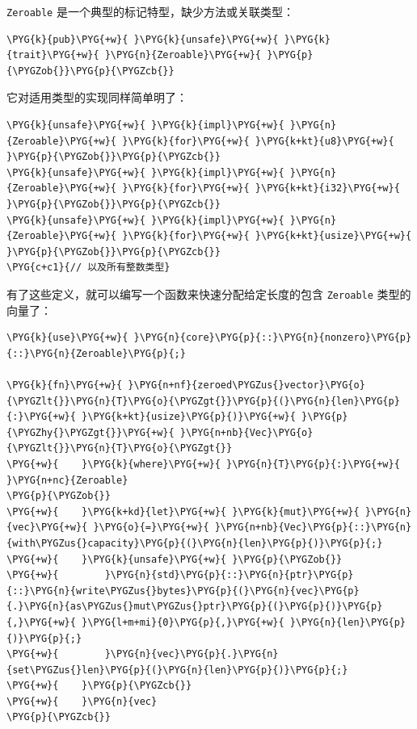 \texttt{Zeroable} 是一个典型的标记特型，缺少方法或关联类型：

\begin{Verbatim}[commandchars=\\\{\},breaklines=true,breakanywhere=true,fontsize=\codefont,xleftmargin=17bp]
\PYG{k}{pub}\PYG{+w}{ }\PYG{k}{unsafe}\PYG{+w}{ }\PYG{k}{trait}\PYG{+w}{ }\PYG{n}{Zeroable}\PYG{+w}{ }\PYG{p}{\PYGZob{}}\PYG{p}{\PYGZcb{}}
\end{Verbatim}

它对适用类型的实现同样简单明了：

\begin{Verbatim}[commandchars=\\\{\},breaklines=true,breakanywhere=true,fontsize=\codefont,xleftmargin=17bp]
\PYG{k}{unsafe}\PYG{+w}{ }\PYG{k}{impl}\PYG{+w}{ }\PYG{n}{Zeroable}\PYG{+w}{ }\PYG{k}{for}\PYG{+w}{ }\PYG{k+kt}{u8}\PYG{+w}{ }\PYG{p}{\PYGZob{}}\PYG{p}{\PYGZcb{}}
\PYG{k}{unsafe}\PYG{+w}{ }\PYG{k}{impl}\PYG{+w}{ }\PYG{n}{Zeroable}\PYG{+w}{ }\PYG{k}{for}\PYG{+w}{ }\PYG{k+kt}{i32}\PYG{+w}{ }\PYG{p}{\PYGZob{}}\PYG{p}{\PYGZcb{}}
\PYG{k}{unsafe}\PYG{+w}{ }\PYG{k}{impl}\PYG{+w}{ }\PYG{n}{Zeroable}\PYG{+w}{ }\PYG{k}{for}\PYG{+w}{ }\PYG{k+kt}{usize}\PYG{+w}{ }\PYG{p}{\PYGZob{}}\PYG{p}{\PYGZcb{}}
\PYG{c+c1}{// 以及所有整数类型}
\end{Verbatim}

有了这些定义，就可以编写一个函数来快速分配给定长度的包含 \texttt{Zeroable} 类型的向量了：

\begin{Verbatim}[commandchars=\\\{\},breaklines=true,breakanywhere=true,fontsize=\codefont,xleftmargin=17bp]
\PYG{k}{use}\PYG{+w}{ }\PYG{n}{core}\PYG{p}{::}\PYG{n}{nonzero}\PYG{p}{::}\PYG{n}{Zeroable}\PYG{p}{;}

\PYG{k}{fn}\PYG{+w}{ }\PYG{n+nf}{zeroed\PYGZus{}vector}\PYG{o}{\PYGZlt{}}\PYG{n}{T}\PYG{o}{\PYGZgt{}}\PYG{p}{(}\PYG{n}{len}\PYG{p}{:}\PYG{+w}{ }\PYG{k+kt}{usize}\PYG{p}{)}\PYG{+w}{ }\PYG{p}{\PYGZhy{}\PYGZgt{}}\PYG{+w}{ }\PYG{n+nb}{Vec}\PYG{o}{\PYGZlt{}}\PYG{n}{T}\PYG{o}{\PYGZgt{}}
\PYG{+w}{    }\PYG{k}{where}\PYG{+w}{ }\PYG{n}{T}\PYG{p}{:}\PYG{+w}{ }\PYG{n+nc}{Zeroable}
\PYG{p}{\PYGZob{}}
\PYG{+w}{    }\PYG{k+kd}{let}\PYG{+w}{ }\PYG{k}{mut}\PYG{+w}{ }\PYG{n}{vec}\PYG{+w}{ }\PYG{o}{=}\PYG{+w}{ }\PYG{n+nb}{Vec}\PYG{p}{::}\PYG{n}{with\PYGZus{}capacity}\PYG{p}{(}\PYG{n}{len}\PYG{p}{)}\PYG{p}{;}
\PYG{+w}{    }\PYG{k}{unsafe}\PYG{+w}{ }\PYG{p}{\PYGZob{}}
\PYG{+w}{        }\PYG{n}{std}\PYG{p}{::}\PYG{n}{ptr}\PYG{p}{::}\PYG{n}{write\PYGZus{}bytes}\PYG{p}{(}\PYG{n}{vec}\PYG{p}{.}\PYG{n}{as\PYGZus{}mut\PYGZus{}ptr}\PYG{p}{(}\PYG{p}{)}\PYG{p}{,}\PYG{+w}{ }\PYG{l+m+mi}{0}\PYG{p}{,}\PYG{+w}{ }\PYG{n}{len}\PYG{p}{)}\PYG{p}{;}
\PYG{+w}{        }\PYG{n}{vec}\PYG{p}{.}\PYG{n}{set\PYGZus{}len}\PYG{p}{(}\PYG{n}{len}\PYG{p}{)}\PYG{p}{;}
\PYG{+w}{    }\PYG{p}{\PYGZcb{}}
\PYG{+w}{    }\PYG{n}{vec}
\PYG{p}{\PYGZcb{}}
\end{Verbatim}

